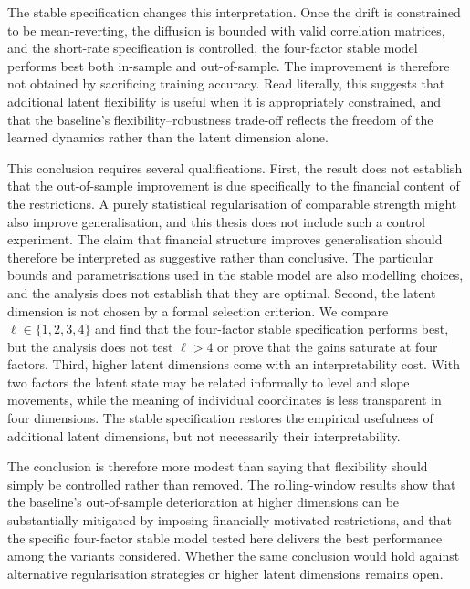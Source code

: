 The stable specification changes this interpretation. Once the drift is constrained to be mean-reverting, the diffusion is bounded with valid correlation matrices, and the short-rate specification is controlled, the four-factor stable model performs best both in-sample and out-of-sample. The improvement is therefore not obtained by sacrificing training accuracy. Read literally, this suggests that additional latent flexibility is useful when it is appropriately constrained, and that the baseline's flexibility--robustness trade-off reflects the freedom of the learned dynamics rather than the latent dimension alone.

This conclusion requires several qualifications. First, the result does not establish that the out-of-sample improvement is due specifically to the financial content of the restrictions. A purely statistical regularisation of comparable strength might also improve generalisation, and this thesis does not include such a control experiment. The claim that financial structure improves generalisation should therefore be interpreted as suggestive rather than conclusive. The particular bounds and parametrisations used in the stable model are also modelling choices, and the analysis does not establish that they are optimal. Second, the latent dimension is not chosen by a formal selection criterion. We compare \(\ell\in\{1,2,3,4\}\) and find that the four-factor stable specification performs best, but the analysis does not test \(\ell>4\) or prove that the gains saturate at four factors. Third, higher latent dimensions come with an interpretability cost. With two factors the latent state may be related informally to level and slope movements, while the meaning of individual coordinates is less transparent in four dimensions. The stable specification restores the empirical usefulness of additional latent dimensions, but not necessarily their interpretability.

The conclusion is therefore more modest than saying that flexibility should simply be controlled rather than removed. The rolling-window results show that the baseline's out-of-sample deterioration at higher dimensions can be substantially mitigated by imposing financially motivated restrictions, and that the specific four-factor stable model tested here delivers the best performance among the variants considered. Whether the same conclusion would hold against alternative regularisation strategies or higher latent dimensions remains open.



